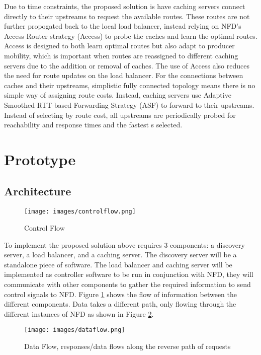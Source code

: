 \documentclass[letterpaper,12pt]{article}
\begin{document}
Due to time constraints, the proposed solution is have caching servers connect directly to their upstreams to request the available routes. These routes are not further propogated back to the local load balancer, instead relying on NFD's Access Router strategy (Access) to probe the caches and learn the optimal routes. Access is designed to both learn optimal routes but also adapt to producer mobility, which is important when routes are reassigned to different caching servers due to the addition or removal of caches. The use of Access also reduces the need for route updates on the load balancer. For the connections between caches and their upstreams, simplistic fully connected topology means there is no simple way of assigning route costs. Instead, caching servers use Adaptive Smoothed RTT-based Forwarding Strategy (ASF) to forward to their upstreams. Instead of selecting by route cost, all upstreams are periodically probed for reachability and response times and the fastest s selected.





\section*{Prototype}

\subsection*{Architecture}

\begin{figure}[ht]
    \centering
    \texttt{[image: images/controlflow.png]}
    \caption{Control Flow}
    \label{control}
\end{figure}

To implement the proposed solution above requires 3 components: a discovery server, a load balancer, and a caching server. The discovery server will be a standalone piece of software. The load balancer and caching server will be implemented as controller software to be run in conjunction with NFD, they will communicate with other components to gather the required information to send control signals to NFD. Figure \ref{control} shows the flow of information between the different components. Data takes a different path, only flowing through the different instances of NFD as shown in Figure \ref{data}.

\begin{figure}[ht]
    \centering
    \texttt{[image: images/dataflow.png]}
    \caption{Data Flow, responses/data flows along the reverse path of requests}
    \label{data}
\end{figure}
\end{document}
